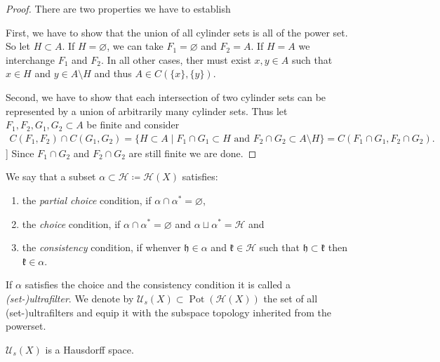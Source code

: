 \begin{proof}
  There are two properties we have to establish
  
  First, we have to show that the union of all cylinder sets is all of the power set. So let \(H \subset A\). If \(H = \varnothing\), we can take \(F_1 = \varnothing\) and \(F_2 = A\). If \(H = A\) we interchange \(F_1\) and \(F_2\). In all other cases, ther must exist \(x,y \in A\) such that \(x \in H\) and \(y \in A \setminus H\) and thus \(A \in C(\{x\}, \{y\})\).

  Second, we have to show that each intersection of two cylinder sets can be represented by a union of arbitrarily many cylinder sets. Thus let \(F_1, F_2, G_1, G_2 \subset A\) be finite and consider
  \begin{align*}
    C(F_1, F_2) \cap C(G_1, G_2)
     = \{H \subset A \mid F_1 \cap G_1 \subset H \text{ and } F_2 \cap G_2 \subset A \setminus H\} = C(F_1 \cap G_1, F_2 \cap G_2).
  \end{align*}]
  Since \(F_1 \cap G_2\) and \(F_2 \cap G_2\) are still finite we are done.
\end{proof}

\begin{defin}
  We say that a subset \(\alpha \subset \mathcal{H} \coloneqq \mathcal{H}(X)\) satisfies:
  \begin{enumerate}
  \item the \emph{partial choice} condition, if \(\alpha \cap \alpha^\ast = \varnothing\),
  \item the \emph{choice} condition, if \(\alpha \cap \alpha^\ast = \varnothing\) and \(\alpha \sqcup \alpha^\ast = \mathcal{H}\) and
  \item the \emph{consistency} condition, if whenver \(\mathfrak{h} \in \alpha\) and \(\mathfrak{k} \in \mathcal{H}\) such that \(\mathfrak{h} \subset \mathfrak{k}\) then \(\mathfrak{k} \in \alpha\).
  \end{enumerate}
  If \(\alpha\) satisfies the choice and the consistency condition it is called a \emph{(set-)ultrafilter}. We denote by \(\mathcal{U}_s(X) \subset \operatorname{Pot}(\mathcal{H}(X))\) the set of all (set-)ultrafilters and equip it with the subspace topology inherited from the powerset.
\end{defin}

\begin{lemma}
  \(\mathcal{U}_s(X)\) is a Hausdorff space.
\end{lemma}

